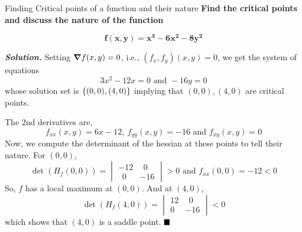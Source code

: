 \documentclass[../Analysis-3.tex]{subfiles}
\begin{document}
\begin{Eg}{Finding Critical points of a function and their nature}{}
  \textbf{Find the critical points and discuss the nature of the function} 
  
  $$\mathbf{f(x,y) = x^3 - 6x^2 - 8y^2}$$

  \textbf{\textit{Solution. }}  Setting $ \grad f(x,y) = 0 $, i.e., $ (f_x,f_y)(x,y) = 0 $, we get the system of equations
  \[ 3x^2 - 12x = 0 \text{  and  }  -16y = 0\]
  whose solution set is $ \qty{(0,0),(4,0)} $ implying that $(0,0), (4,0)$ are critical points.

  The 2nd derivatives are, \[ f_{xx}(x,y) = 6x - 12,\ f_{yy}(x,y) = -16 \text{ and } f_{xy}(x,y) = 0 \]
  Now, we compute the determinant of the hessian at these points to tell their nature. For $(0,0)$,
  \[ \det(H_f(0,0)) =  \begin{vmatrix}
      -12   & \ \ 0 \\
      \ \ 0 & -16
    \end{vmatrix} > 0 \text{  and  } f_{xx}(0,0) = -12 < 0\]
  So, $f$ has a local maximum at $(0,0)$. And at $(4,0)$,
  \[ \det(H_f(4,0)) =  \begin{vmatrix}
      12 & \ \ 0 \\
      0  & -16
    \end{vmatrix} < 0 \]
  which shows that $(4,0)$ is a saddle point. $\hfill \blacksquare$
\end{Eg}
\end{document}
